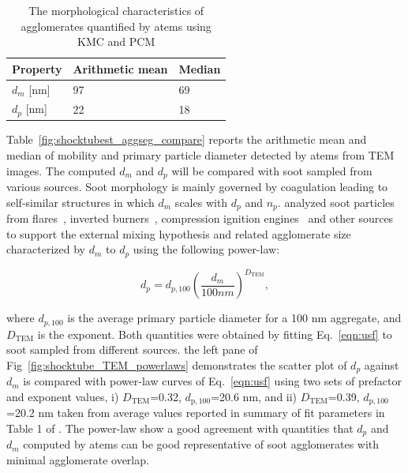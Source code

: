 \begin{table}
	\caption{The morphological characteristics of agglomerates quantified by atems using KMC and PCM}
	\label{tab:shocktube_TEM_morph}
	\centering
	\begin{tabular}{l l l}
		\hline
		Property & Arithmetic mean & Median \\
		\hline
		$d_m$ [nm] & 97 & 69 \\
		$d_p$ [nm] & 22 & 18 \\
		\hline
	\end{tabular}
\end{table}


Table~\ref{fig:shocktubest_aggseg_compare} reports the arithmetic mean and median of mobility and primary particle diameter detected by atems from TEM images. The computed $d_m$ and $d_p$ will be compared with soot sampled from various sources. Soot morphology is mainly governed by coagulation leading to self-similar structures in which $d_m$ scales with $d_p$ and $n_p$. 
\citet{olfert2019universal} analyzed soot particles from flares~\citep{kazemimanesh2019size}, inverted burners~\citep{dastanpour2017variation}, compression ignition engines~\citep{graves2015characterization} and other sources to support the external mixing hypothesis and related agglomerate size characterized by $d_m$ to $d_p$ using the following power-law:

\begin{equation}
	d_{p} = d_{p,100} 
	\left(
	\frac{d_m}{100 nm}
	\right)^{D_{\mathrm{TEM}}},
	\label{eqn:usf}
\end{equation}

\noindent where $d_{p,100}$ is the average primary particle diameter for a 100 nm aggregate, and $D_{\mathrm{TEM}}$ is the exponent. Both quantities were obtained by fitting Eq.~\eqref{eqn:usf} to soot sampled from different sources. the left pane of Fig~\ref{fig:shocktube_TEM_powerlaws} demonstrates the scatter plot of $d_p$ against $d_m$ is compared with power-law curves of Eq.~\eqref{eqn:usf} using two sets of prefactor and exponent values, i) $D_{\mathrm{TEM}}$=0.32, $d_{\mathrm{p,100}}$=20.6 nm, and ii) $D_{\mathrm{TEM}}$=0.39, $d_{\mathrm{p,100}}$=20.2 nm taken from average values reported in summary of fit parameters in Table 1 of \citet{olfert2019universal}. The power-law show a good agreement with quantities that $d_p$ and $d_m$ computed by atems can be good representative of soot agglomerates with minimal agglomerate overlap.

